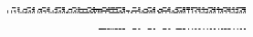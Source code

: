 \documentclass[10pt]{article}
\theoremstyle{plain}
\theoremstyle{definition}
\begin{document}
\begin{table*}[b]
{\begin{minipage}{5.32in}
\[\begin{array}{@{}r@{}}
\begin{array}{@{}l@{}}
\a\a\a\a\a\a\a\a\b\b\b\b\a\a\b\b\a\a\a\a\a\a\a\a\b\b\b\b\a\a\b\b\a\a\a\a \a\a\a\a\b\b\b\b\a\a\b\b\a\a\a\a\a\a\b\b\b\b\b\b\a\b\b\b\a\a\a\a\a\a\a\a \b\b\b\b\a\a\b\b\a\a\a\a\a\a\a\a\b\b\b\b\a\a\b\b\a\a\a\a\a\a\a\a\b\b\b\b \a\a\b\b\a\b\b\b\b\a\b\b\b\b\b\b\a\b\b\b\a\a\a\a\a\a\a\a\b\b\b\b\a\a\b\b \a\a\a\a\a\a\a\a\b\b\b\b\a\a\b\b\a\a\a\a\a\a\a\a\b\b\b\b\a\a\b\b\a\a\a\a \a\a\b\b\b\b\b\b\a\b\b\b\a\b\b\b\b\a\b\b\b\b\b\b\b\a\b\b\a\a\b\b\a\a\a\a \b\b\b\b\b\a\b\b\a\a\b\b\a\a\a\a\b\b\b\b\b\a\b\b\a\a\b\b\a\a\b\b\b\b\b\b \b\b\b\b\mynl
\a\a\a\a\a\a\a\a\a\a\a\a\a\a\b\b\a\a\a\a\b\b\b\b\a\a\a\a\a\b\b\b\a\a\a\a \b\b\b\b\a\a\a\a\a\b\b\b\a\a\a\a\a\b\b\b\a\a\a\a\a\b\b\b\a\a\a\a\b\b\b\b \a\a\a\a\b\a\b\b\b\b\b\b\b\b\b\b\a\a\a\a\b\b\b\b\b\b\b\b\b\b\b\b\a\a\a\a \b\b\b\b\b\b\b\b\b\b\b\b\a\a\a\a\a\b\b\b\a\a\a\a\a\a\a\a\a\a\a\a\a\a\b\b \a\a\a\a\b\b\b\b\a\a\a\a\a\b\b\b\a\a\a\a\b\b\b\b\a\a\a\a\a\b\b\b\a\a\a\a \a\b\b\b\a\a\a\a\a\b\b\b\a\b\b\b\b\a\b\b\a\a\a\a\b\b\b\b\a\b\b\b\b\b\b\b \a\a\a\a\b\b\b\b\a\b\b\b\b\b\b\b\a\a\a\a\b\b\b\b\a\b\b\b\a\b\b\b\a\a\a\a \b\b\b\b\mynl
\a\a\a\b\a\a\a\b\a\a\b\b\a\a\b\b\a\a\a\b\a\a\a\b\a\a\b\b\a\a\b\b\a\a\a\b \a\a\b\b\a\b\b\b\a\b\b\b\a\a\a\b\a\a\a\b\a\a\b\b\a\a\b\b\a\a\a\b\a\a\a\b \a\a\b\b\a\a\b\b\a\a\a\b\a\a\a\b\a\a\b\b\a\a\b\b\a\b\a\b\b\a\b\b\b\b\b\b \b\b\b\b\a\a\a\b\a\a\a\b\a\a\b\b\a\a\b\b\a\b\b\b\b\a\a\b\b\b\b\b\b\b\b\b \a\a\b\b\a\a\a\b\b\a\b\b\b\a\b\b\a\a\b\b\a\a\b\b\b\b\b\b\b\b\b\b\a\a\b\b \a\a\a\b\b\a\b\b\b\a\b\b\a\a\a\b\a\a\a\b\a\a\b\b\a\a\b\b\a\a\a\b\a\a\a\b \a\a\b\b\a\a\b\b\a\a\a\b\a\a\b\b\a\b\b\b\a\b\b\b\a\a\a\b\a\a\a\b\a\a\b\b \a\a\b\b\mynl
\a\a\a\b\a\a\a\b\a\a\a\b\a\a\a\b\a\b\a\b\a\b\b\b\a\b\a\b\a\b\a\b\a\a\a\b \a\b\a\b\a\a\a\b\a\a\a\b\a\b\a\b\a\b\b\b\a\b\a\b\a\b\a\b\a\b\b\b\a\b\a\b \a\b\a\b\a\b\a\b\b\b\b\b\b\b\b\b\b\b\a\b\b\b\a\b\b\a\a\b\a\b\a\b\a\a\a\b \a\a\a\b\b\b\b\b\b\b\b\b\b\b\a\b\b\b\a\b\a\a\a\b\a\a\b\b\a\a\a\b\a\a\a\b \a\b\a\b\b\b\b\b\a\b\a\b\a\b\a\b\a\a\a\b\b\b\a\b\a\a\a\b\a\a\a\b\a\b\a\b \b\b\b\b\a\b\a\b\a\b\a\b\a\a\a\b\a\a\a\b\a\a\a\b\a\a\a\b\a\b\a\b\a\b\b\b \a\b\a\b\a\b\a\b\a\a\a\b\a\b\a\b\a\a\a\b\a\a\a\b\a\b\a\b\a\b\b\b\a\b\a\b \a\b\a\b
\end{array}
\mynnl
\begin{array}{@{}l@{}}
\a\a\a\a\a\a\a\a\a\a\a\a\a\a\a\a\a\a\a\a\a\a\a\a\a\a\a\a\a\a\a\a\a\a\a\a \a\a\a\a\a\a\a\a\a\a\a\a\a\a\a\a\a\a\a\a\a\a\a\a\a\a\a\a\a\a\a\a\a\a\a\a \a\a\a\a\a\a\a\a\a\a\a\a\a\a\a\a\a\a\a\a\a\a\a\a\a\a\a\a\b\b\b\b\b\b\b\b \a\b\b\b\a\b\a\b\a\b\b\b\a\b\b\b\a\b\b\b\a\a\a\a\a\a\a\a\b\b\b\b\a\a\b\b \a\a\a\a\a\a\a\a\b\b\b\b\a\a\b\b\a\a\a\a\a\a\a\a\b\b\b\b\a\a\b\b\a\a\a\a \a\a\b\b\b\b\b\b\a\b\b\b\a\a\a\b\a\a\a\b\a\a\b\b\a\a\b\b\a\a\a\b\a\a\a\b \a\a\b\b\a\a\b\b\a\a\a\b\a\a\b\b\a\b\b\b\a\b\b\b\a\a\a\b\a\a\a\b\a\a\b\b \a\a\b\b\mynl

\end{array}
\end{array}\]
\end{minipage}}
\end{table*}
\end{document}
